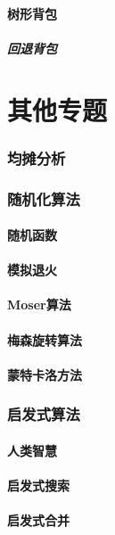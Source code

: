 \documentclass[12pt,a4paper]{article}
\begin{document}
\subsection{树形背包}
\subsubsection{回退背包}

\newpage
\part{其他专题}
\section{均摊分析}

\newpage
\section{随机化算法}
\subsection{随机函数}
\subsection{模拟退火} %
\subsection{Moser算法}
\subsection{梅森旋转算法}
\subsection{蒙特卡洛方法}

\newpage
\section{启发式算法}
\subsection{人类智慧} %
\subsection{启发式搜索}
\subsection{启发式合并}
\end{document}
